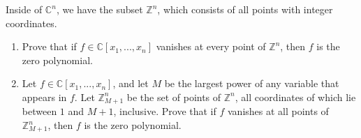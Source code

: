 \begin{exercise}{6}
    Inside of $\mathbb{C}^n$, we have the subset $\mathbb{Z}^n$, which consists of all points with integer coordinates.
    \begin{enumerate}
        \item Prove that if $f\in \mathbb{C}[x_1,...,x_n]$ vanishes at every point of $\mathbb{Z}^n$, then $f$ is the zero polynomial.
        \item Let $f\in \mathbb{C}[x_1,...,x_n]$, and let $M$ be the largest power of any variable that appears in $f$. Let $\mathbb{Z}_{M+1}^n$ be the set of points of $\mathbb{Z}^n$, all coordinates of which lie between $1$ and $M+1$, inclusive. Prove that if $f$ vanishes at all points of $\mathbb{Z}_{M+1}^n$, then $f$ is the zero polynomial.
    \end{enumerate}
\end{exercise}
